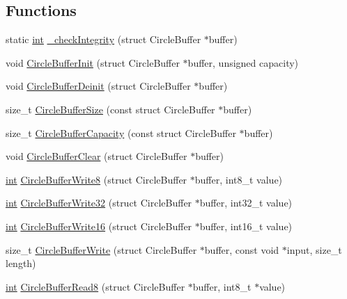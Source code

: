 \subsection*{Functions}
\begin{DoxyCompactItemize}
\item 
static \mbox{\hyperlink{ioapi_8h_a787fa3cf048117ba7123753c1e74fcd6}{int}} \mbox{\hyperlink{circle-buffer_8c_a2916ab7c3aec1de4db02d13b1c6bf197}{\+\_\+check\+Integrity}} (struct Circle\+Buffer $\ast$buffer)
\item 
void \mbox{\hyperlink{circle-buffer_8c_afaa8d0d895fcf4ce976a956ef6cc97bb}{Circle\+Buffer\+Init}} (struct Circle\+Buffer $\ast$buffer, unsigned capacity)
\item 
void \mbox{\hyperlink{circle-buffer_8c_ace75de8785dd1b075cab547bf6f81563}{Circle\+Buffer\+Deinit}} (struct Circle\+Buffer $\ast$buffer)
\item 
size\+\_\+t \mbox{\hyperlink{circle-buffer_8c_a3cd592fc508fc16e0687ef249a7985f6}{Circle\+Buffer\+Size}} (const struct Circle\+Buffer $\ast$buffer)
\item 
size\+\_\+t \mbox{\hyperlink{circle-buffer_8c_a5ebad1136fc47aa3316b61c8efdd1ac4}{Circle\+Buffer\+Capacity}} (const struct Circle\+Buffer $\ast$buffer)
\item 
void \mbox{\hyperlink{circle-buffer_8c_a7f5170ef02fb49586dea9482e562c400}{Circle\+Buffer\+Clear}} (struct Circle\+Buffer $\ast$buffer)
\item 
\mbox{\hyperlink{ioapi_8h_a787fa3cf048117ba7123753c1e74fcd6}{int}} \mbox{\hyperlink{circle-buffer_8c_aa1562239ba1cf3c0e7d570a184bcbd7b}{Circle\+Buffer\+Write8}} (struct Circle\+Buffer $\ast$buffer, int8\+\_\+t value)
\item 
\mbox{\hyperlink{ioapi_8h_a787fa3cf048117ba7123753c1e74fcd6}{int}} \mbox{\hyperlink{circle-buffer_8c_a056daa52414e0ab9796fa8079100bd82}{Circle\+Buffer\+Write32}} (struct Circle\+Buffer $\ast$buffer, int32\+\_\+t value)
\item 
\mbox{\hyperlink{ioapi_8h_a787fa3cf048117ba7123753c1e74fcd6}{int}} \mbox{\hyperlink{circle-buffer_8c_ababcf59a66d885ec2f94f1f189c49f9e}{Circle\+Buffer\+Write16}} (struct Circle\+Buffer $\ast$buffer, int16\+\_\+t value)
\item 
size\+\_\+t \mbox{\hyperlink{circle-buffer_8c_a296b8a91ed215aae7b8627c4f42ece8b}{Circle\+Buffer\+Write}} (struct Circle\+Buffer $\ast$buffer, const void $\ast$input, size\+\_\+t length)
\item 
\mbox{\hyperlink{ioapi_8h_a787fa3cf048117ba7123753c1e74fcd6}{int}} \mbox{\hyperlink{circle-buffer_8c_a715de2b8c3a6b466d1a2fd2f7efae286}{Circle\+Buffer\+Read8}} (struct Circle\+Buffer $\ast$buffer, int8\+\_\+t $\ast$value)

\end{DoxyCompactItemize}
